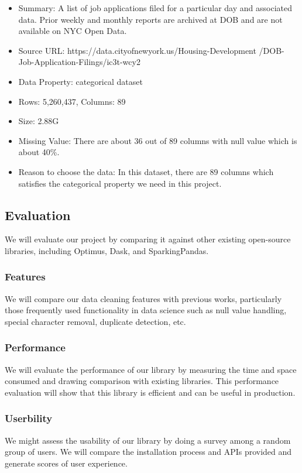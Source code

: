 \documentclass[sigconf]{acmart}
\begin{document}
\begin{itemize}
	\item{Summary: A list of job applications filed for a particular day and associated data. Prior weekly and monthly reports are archived at DOB and are not available on NYC Open Data.}
	\item{Source URL: https://data.cityofnewyork.us/Housing-Development
	/DOB-Job-Application-Filings/ic3t-wcy2}
	\item{Data Property: categorical dataset}
	\item{Rows: 5,260,437, Columns: 89}
	\item{Size: 2.88G}
	\item{Missing Value: There are about 36 out of 89 columns with null value which is about 40\%.}
	\item{Reason to choose the data: In this dataset, there are 89 columns which satisfies the categorical property we need in this project.}
\end{itemize}
\subsection{Evaluation}
We will evaluate our project by comparing it against other existing open-source libraries, including Optimus\cite{optimus}, Dask\cite{dask}, and SparkingPandas\cite{sparklingpandas}. 
\subsubsection{Features}
We will compare our data cleaning features with previous works, particularly those frequently used functionality in data science such as null value handling, special character removal, duplicate detection, etc. 
\subsubsection{Performance}
We will evaluate the performance of our library by measuring the time and space consumed and drawing comparison with existing libraries. This performance evaluation will show that this library is efficient and can be useful in production. 
\subsubsection{Userbility}
We might assess the usability of our library by doing a survey among a random group of users. We will compare the installation process and APIs provided and generate scores of user experience.
\end{document}
